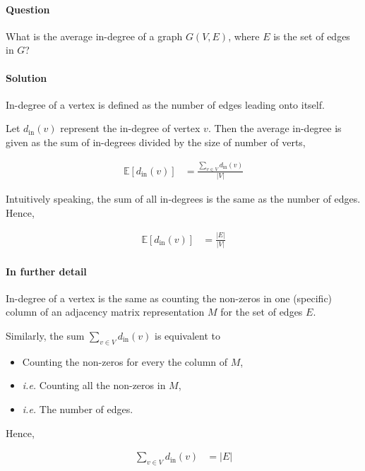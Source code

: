 \documentclass[11pt]{article}
\begin{document}
\paragraph*{Question}
\label{sec:org3cb4fc6}
What is the average in-degree of a graph \(G(V,E)\),
where \(E\) is the set of edges in \(G\)?

\paragraph*{Solution}
\label{sec:orgc391b90}
In-degree of a vertex is defined as the number of
edges leading onto itself.

Let \(d_{\mathrm{in}}(v)\) represent the in-degree of
vertex \(v\).  Then the average in-degree is given as the
sum of in-degrees divided by the size of number of
verts,

\begin{align*}
  \mathbb{E}[d_{\mathrm{in}}(v)]
  &= \frac{\sum_{v\in V}d_{\mathrm{in}}(v)} {|V|}
\end{align*}

Intuitively speaking, the sum of all in-degrees is the
same as the number of edges. Hence,

\begin{align*}
  \mathbb{E}[d_{\mathrm{in}}(v)]
  &= \frac{|E|} {|V|}
\end{align*}

\paragraph*{In further detail}
\label{sec:orgd1eb5be}

In-degree of a vertex is the same as counting the
non-zeros in one (specific) column of an adjacency
matrix representation \(M\) for the set of edges \(E\).

Similarly, the sum \(\sum_{v\in V}d_{\mathrm{in}}(v)\) is
equivalent to

\begin{itemize}
\item Counting the non-zeros for every the column of \(M\),
\item \emph{i.e.} Counting all the non-zeros in \(M\),
\item \emph{i.e.} The number of edges.
\end{itemize}

Hence,

\begin{align*}
  \sum_{v\in V} d_{\mathrm{in}}(v)
    &= |E|
\end{align*}
\end{document}
